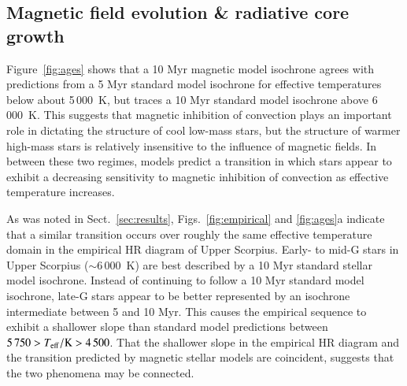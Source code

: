 \documentclass{aa}
\begin{document}
\subsection{Magnetic field evolution \& radiative core growth}
\label{sec:dynamo}
Figure~\ref{fig:ages} shows that a 10 Myr magnetic model isochrone agrees with predictions from a 5 Myr standard model isochrone for effective temperatures below about 5\,000~K, but traces a 10 Myr standard model isochrone above 6\,000~K. This suggests that magnetic inhibition of convection plays an important role in dictating the structure of cool low-mass stars, but the structure of warmer high-mass stars is relatively insensitive to the influence of magnetic fields. In between these two regimes, models predict a transition in which stars appear to exhibit a decreasing sensitivity to magnetic inhibition of convection as effective temperature increases.

As was noted in Sect.~\ref{sec:results}, Figs.~\ref{fig:empirical} and \ref{fig:ages}a indicate that a similar transition occurs over roughly the same effective temperature domain in the empirical HR diagram of Upper Scorpius. Early- to mid-G stars in Upper Scorpius (\teff$ \sim 6\,000$~K) are best described by a 10 Myr standard stellar model isochrone. Instead of continuing to follow a 10 Myr standard model isochrone, late-G stars appear to be better represented by an isochrone intermediate between 5 and 10 Myr. This causes the empirical sequence to exhibit a shallower slope than standard model predictions between $5\,750 > T_{\rm eff} / {\rm K} > 4\,500$. That the shallower slope in the empirical HR diagram and the transition predicted by magnetic stellar models are coincident, suggests that the two phenomena may be connected.
\end{document}
